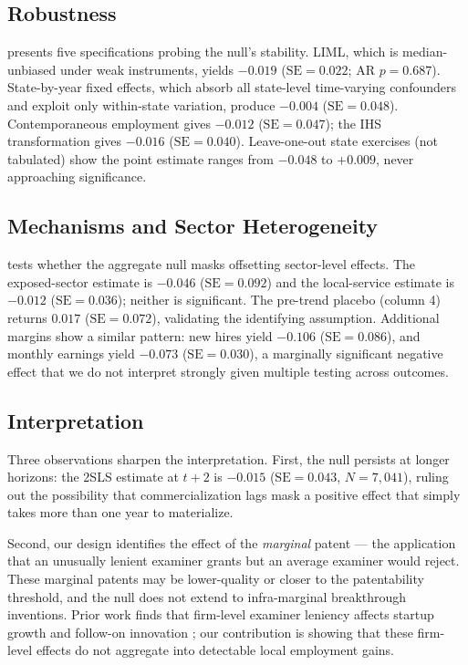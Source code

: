 \documentclass[12pt]{article}
\begin{document}


\subsection{Robustness}

 presents five specifications probing the null's stability. LIML, which is median-unbiased under weak instruments, yields $-0.019$ ($\text{SE}=0.022$; AR $p=0.687$). State-by-year fixed effects, which absorb all state-level time-varying confounders and exploit only within-state variation, produce $-0.004$ ($\text{SE}=0.048$). Contemporaneous employment gives $-0.012$ ($\text{SE}=0.047$); the IHS transformation gives $-0.016$ ($\text{SE}=0.040$). Leave-one-out state exercises (not tabulated) show the point estimate ranges from $-0.048$ to $+0.009$, never approaching significance.



\subsection{Mechanisms and Sector Heterogeneity}

 tests whether the aggregate null masks offsetting sector-level effects. The exposed-sector estimate is $-0.046$ ($\text{SE}=0.092$) and the local-service estimate is $-0.012$ ($\text{SE}=0.036$); neither is significant. The pre-trend placebo (column 4) returns $0.017$ ($\text{SE}=0.072$), validating the identifying assumption. Additional margins show a similar pattern: new hires yield $-0.106$ ($\text{SE}=0.086$), and monthly earnings yield $-0.073$ ($\text{SE}=0.030$), a marginally significant negative effect that we do not interpret strongly given multiple testing across outcomes.



\subsection{Interpretation}

Three observations sharpen the interpretation. First, the null persists at longer horizons: the 2SLS estimate at $t+2$ is $-0.015$ ($\text{SE}=0.043$, $N=7{,}041$), ruling out the possibility that commercialization lags mask a positive effect that simply takes more than one year to materialize.

Second, our design identifies the effect of the \textit{marginal} patent --- the application that an unusually lenient examiner grants but an average examiner would reject. These marginal patents may be lower-quality or closer to the patentability threshold, and the null does not extend to infra-marginal breakthrough inventions. Prior work finds that firm-level examiner leniency affects startup growth \citep{farre2020patent} and follow-on innovation \citep{galasso2015patents}; our contribution is showing that these firm-level effects do not aggregate into detectable local employment gains.
\end{document}
